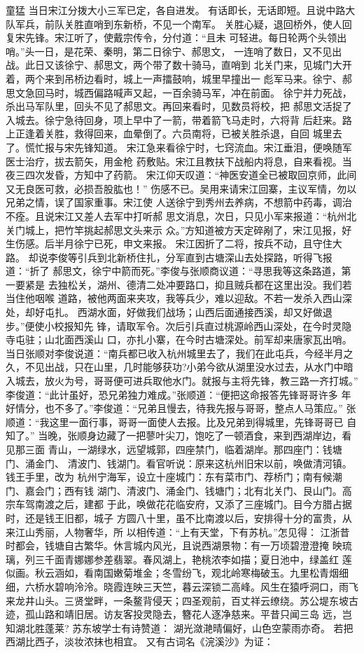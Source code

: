 童猛
当日宋江分拨大小三军已定，各自进发。
有话即长，无话即短。且说中路大队军兵，前队关胜直哨到东新桥，不见一个南军。
关胜心疑，退回桥外，使人回复宋先锋。宋江听了，使戴宗传令，分付道：“且未
可轻进。每日轮两个头领出哨。”头一日，是花荣、秦明，第二日徐宁、郝思文，
一连哨了数日，又不见出战。此日又该徐宁、郝思文，两个带了数十骑马，直哨到
北关门来，见城门大开着，两个来到吊桥边看时，城上一声擂鼓响，城里早撞出一
彪军马来。徐宁、郝思文急回马时，城西偏路喊声又起，一百余骑马军，冲在前面。
徐宁并力死战，杀出马军队里，回头不见了郝思文。再回来看时，见数员将校，把
郝思文活捉了入城去。徐宁急待回身，项上早中了一箭，带着箭飞马走时，六将背
后赶来。路上正逢着关胜，救得回来，血晕倒了。六员南将，已被关胜杀退，自回
城里去了。慌忙报与宋先锋知道。
宋江急来看徐宁时，七窍流血。宋江垂泪，便唤随军医士治疗，拔去箭矢，用金枪
药敷贴。宋江且教扶下战船内将息，自来看视。当夜三四次发昏，方知中了药箭。
宋江仰天叹道：“神医安道全已被取回京师，此间又无良医可救，必损吾股肱也！”
伤感不已。吴用来请宋江回寨，主议军情，勿以兄弟之情，误了国家重事。宋江使
人送徐宁到秀州去养病，不想箭中药毒，调治不痊。且说宋江又差人去军中打听郝
思文消息，次日，只见小军来报道：“杭州北关门城上，把竹竿挑起郝思文头来示
众。”方知道被方天定碎剐了，宋江见报，好生伤感。后半月徐宁已死，申文来报。
宋江因折了二将，按兵不动，且守住大路。
却说李俊等引兵到北新桥住扎，分军直到古塘深山去处探路，听得飞报道：“折了
郝思文，徐宁中箭而死。”李俊与张顺商议道：“寻思我等这条路道，第一要紧是
去独松关，湖州、德清二处冲要路口，抑且贼兵都在这里出没。我们若当住他咽喉
道路，被他两面来夹攻，我等兵少，难以迎敌。不若一发杀入西山深处，却好屯扎。
西湖水面，好做我们战场；山西后面通接西溪，却又好做退步。”便使小校报知先
锋，请取军令。次后引兵直过桃源岭西山深处，在今时灵隐寺屯驻；山北面西溪山
口，亦扎小寨，在今时古塘深处。前军却来唐家瓦出哨。
当日张顺对李俊说道：“南兵都已收入杭州城里去了，我们在此屯兵，今经半月之
久，不见出战，只在山里，几时能够获功?小弟今欲从湖里没水过去，从水门中暗
入城去，放火为号，哥哥便可进兵取他水门。就报与主将先锋，教三路一齐打城。”
李俊道：“此计虽好，恐兄弟独力难成。”张顺道：“便把这命报答先锋哥哥许多
年好情分，也不多了。”李俊道：“兄弟且慢去，待我先报与哥哥，整点人马策应。”
张顺道：“我这里一面行事，哥哥一面使人去报。比及兄弟到得城里，先锋哥哥已
自知了。”
当晚，张顺身边藏了一把蓼叶尖刀，饱吃了一顿酒食，来到西湖岸边，看见那三面
青山，一湖绿水，远望城郭，四座禁门，临着湖岸。那四座门：钱塘门、涌金门、
清波门、钱湖门。看官听说：原来这杭州旧宋以前，唤做清河镇。钱王手里，改为
杭州宁海军，设立十座城门：东有菜市门、荐桥门；南有候潮门、嘉会门；西有钱
湖门、清波门、涌金门、钱塘门；北有北关门、艮山门。高宗车驾南渡之后，建都
于此，唤做花花临安府，又添了三座城门。目今方腊占据时，还是钱王旧都，城子
方圆八十里，虽不比南渡以后，安排得十分的富贵，从来江山秀丽，人物奢华，所
以相传道：“上有天堂，下有苏杭。”怎见得：
江浙昔时都会，钱塘自古繁华。休言城内风光，且说西湖景物：有一万顷碧澄澄掩
映琉璃，列三千面青娜娜参差翡翠。春风湖上，艳桃浓李如描；夏日池中，绿盖红
莲似画。秋云涵如，看南国嫩菊堆金；冬雪纷飞，观北岭寒梅破玉。九里松青烟细
细，六桥水碧响泠泠。晓霞连映三天竺，暮云深锁二高峰。风生在猿呼洞口，雨飞
来龙井山头。三贤堂畔，一条鳌背侵天；四圣观前，百丈祥云缭绕。苏公堤东坡古
迹，孤山路和靖旧居。访友客投灵隐去，簪花人逐净慈来。平昔只闻三岛
远，岂知湖北胜蓬莱?
苏东坡学士有诗赞道：
湖光潋滟晴偏好，山色空蒙雨亦奇。
若把西湖比西子，淡妆浓抹也相宜。
又有古词名《浣溪沙》为证：

